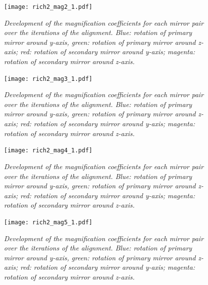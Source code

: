 \begin{figure}[!ht]
	\vspace*{-0.cm}
	\begin{center}
		\texttt{[image: rich2\_mag2\_1.pdf]}
		\vspace*{-1.5cm}
	\end{center}
	\caption{\textit{Development of the magnification coefficients for each mirror pair over the iterations of the alignment. Blue: rotation of primary mirror around y-axis, green: rotation of primary mirror around z-axis; red: rotation of secondary mirror around y-axis; magenta: rotation of secondary mirror around z-axis.}}
	\label{fig:rich2mag2_1}
\end{figure}
\begin{figure}[!ht]
	\vspace*{-0.cm}
	\begin{center}
		\texttt{[image: rich2\_mag3\_1.pdf]}
		\vspace*{-1.5cm}
	\end{center}
	\caption{\textit{Development of the magnification coefficients for each mirror pair over the iterations of the alignment. Blue: rotation of primary mirror around y-axis, green: rotation of primary mirror around z-axis; red: rotation of secondary mirror around y-axis; magenta: rotation of secondary mirror around z-axis.}}
	\label{fig:rich2mag3_1}
\end{figure}
\begin{figure}[!ht]
	\vspace*{-0.cm}
	\begin{center}
		\texttt{[image: rich2\_mag4\_1.pdf]}
		\vspace*{-1.5cm}
	\end{center}
	\caption{\textit{Development of the magnification coefficients for each mirror pair over the iterations of the alignment. Blue: rotation of primary mirror around y-axis, green: rotation of primary mirror around z-axis; red: rotation of secondary mirror around y-axis; magenta: rotation of secondary mirror around z-axis.}}
	\label{fig:rich2mag4_1}
\end{figure}
\begin{figure}[!ht]
	\vspace*{-0.cm}
	\begin{center}
		\texttt{[image: rich2\_mag5\_1.pdf]}
		\vspace*{-1.5cm}
	\end{center}
	\caption{\textit{Development of the magnification coefficients for each mirror pair over the iterations of the alignment. Blue: rotation of primary mirror around y-axis, green: rotation of primary mirror around z-axis; red: rotation of secondary mirror around y-axis; magenta: rotation of secondary mirror around z-axis.}}
	\label{fig:rich2mag5_1}
\end{figure}
